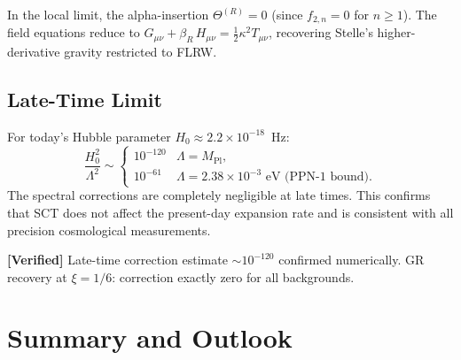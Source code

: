 \documentclass[11pt,a4paper]{article}
\theoremstyle{plain}
\theoremstyle{definition}
\newcommand{\verified}[1]{%
  \par\smallskip\noindent
  \colorbox{green!10}{\parbox{\dimexpr\linewidth-2\fboxsep}{%
    \textcolor{green!50!black}{\textbf{[Verified]}} #1}}%
  \par\smallskip}
\begin{document}
In the local limit, the alpha-insertion $\Theta^{(R)} = 0$ (since
$f_{2,n} = 0$ for $n \geq 1$). The field equations reduce to
$G_{\mu\nu} + \beta_R\,H_{\mu\nu} = \frac{1}{2}\kappa^2 T_{\mu\nu}$,
recovering Stelle's higher-derivative gravity restricted to FLRW.

\subsection{Late-Time Limit}

For today's Hubble parameter $H_0 \approx 2.2 \times 10^{-18}$~Hz:
\begin{equation}\label{eq:late-time}
  \frac{H_0^2}{\Lambda^2} \sim
  \begin{cases}
    10^{-120} & \Lambda = M_{\mathrm{Pl}}, \\
    10^{-61} & \Lambda = 2.38\times 10^{-3}\text{~eV (PPN-1 bound)}.
  \end{cases}
\end{equation}
The spectral corrections are completely negligible at late times.
This confirms that SCT does not affect the present-day expansion
rate and is consistent with all precision cosmological measurements.

\verified{Late-time correction estimate $\sim 10^{-120}$ confirmed
numerically. GR recovery at $\xi = 1/6$: correction exactly zero
for all backgrounds.}

\section{Summary and Outlook}\label{sec:summary}
\end{document}
